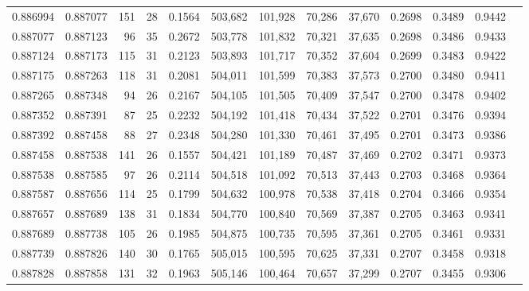 \begin{tabular}{rrrrrrrrrrrrr}
0.886994 & 0.887077 &   151 &  28 &                                     0.1564 & 503,682 & 101,928 &  70,286 &  37,670 & 0.2698 & 0.3489 & 0.9442 \\
0.887077 & 0.887123 &    96 &  35 &                                     0.2672 & 503,778 & 101,832 &  70,321 &  37,635 & 0.2698 & 0.3486 & 0.9433 \\
0.887124 & 0.887173 &   115 &  31 &                                     0.2123 & 503,893 & 101,717 &  70,352 &  37,604 & 0.2699 & 0.3483 & 0.9422 \\
0.887175 & 0.887263 &   118 &  31 &                                     0.2081 & 504,011 & 101,599 &  70,383 &  37,573 & 0.2700 & 0.3480 & 0.9411 \\
0.887265 & 0.887348 &    94 &  26 &                                     0.2167 & 504,105 & 101,505 &  70,409 &  37,547 & 0.2700 & 0.3478 & 0.9402 \\
0.887352 & 0.887391 &    87 &  25 &                                     0.2232 & 504,192 & 101,418 &  70,434 &  37,522 & 0.2701 & 0.3476 & 0.9394 \\
0.887392 & 0.887458 &    88 &  27 &                                     0.2348 & 504,280 & 101,330 &  70,461 &  37,495 & 0.2701 & 0.3473 & 0.9386 \\
0.887458 & 0.887538 &   141 &  26 &                                     0.1557 & 504,421 & 101,189 &  70,487 &  37,469 & 0.2702 & 0.3471 & 0.9373 \\
0.887538 & 0.887585 &    97 &  26 &                                     0.2114 & 504,518 & 101,092 &  70,513 &  37,443 & 0.2703 & 0.3468 & 0.9364 \\
0.887587 & 0.887656 &   114 &  25 &                                     0.1799 & 504,632 & 100,978 &  70,538 &  37,418 & 0.2704 & 0.3466 & 0.9354 \\
0.887657 & 0.887689 &   138 &  31 &                                     0.1834 & 504,770 & 100,840 &  70,569 &  37,387 & 0.2705 & 0.3463 & 0.9341 \\
0.887689 & 0.887738 &   105 &  26 &                                     0.1985 & 504,875 & 100,735 &  70,595 &  37,361 & 0.2705 & 0.3461 & 0.9331 \\
0.887739 & 0.887826 &   140 &  30 &                                     0.1765 & 505,015 & 100,595 &  70,625 &  37,331 & 0.2707 & 0.3458 & 0.9318 \\
0.887828 & 0.887858 &   131 &  32 &                                     0.1963 & 505,146 & 100,464 &  70,657 &  37,299 & 0.2707 & 0.3455 & 0.9306 \\

\end{tabular}
